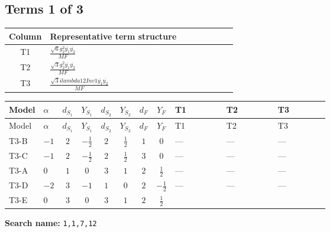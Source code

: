 \documentclass[8pt]{article}
\begin{document}
\begin{landscape}
\subsection*{Terms 1 of 3}
\begin{center}
\begin{tabular}{@{}c >{\raggedright\arraybackslash}p{0.82\linewidth}@{}}
\toprule
Column & Representative term structure \\
\midrule
T1 & \(\displaystyle \frac{\sqrt{6} g_{2}^{2} \overline{y_{1}} \overline{y_{2}}}{MF}\) \\
\midrule
T2 & \(\displaystyle \frac{\sqrt{3} g_{2}^{2} \overline{y_{1}} \overline{y_{2}}}{MF}\) \\
\midrule
T3 & \(\displaystyle \frac{\sqrt{3} i lambda12Inv1 \overline{y_{1}} \overline{y_{2}}}{MF}\) \\
\midrule
\bottomrule
\end{tabular}
\end{center}
\smallskip
\tiny
\begin{longtable}{@{}llcccccc >{\raggedright\arraybackslash}p{0.21\linewidth} >{\raggedright\arraybackslash}p{0.21\linewidth} >{\raggedright\arraybackslash}p{0.21\linewidth}@{}}
\toprule
Model & $\alpha$ & $d_{S_1}$ & $Y_{S_1}$ & $d_{S_2}$ & $Y_{S_2}$ & $d_F$ & $Y_F$ & T1 & T2 & T3 \\
\midrule
\endfirsthead
\toprule
Model & $\alpha$ & $d_{S_1}$ & $Y_{S_1}$ & $d_{S_2}$ & $Y_{S_2}$ & $d_F$ & $Y_F$ & T1 & T2 & T3 \\
\midrule
\endhead
T3-B & $-1$ & $2$ & $-\frac{1}{2}$ & $2$ & $\frac{1}{2}$ & $1$ & $0$ & --- & --- & --- \\
\midrule
T3-C & $-1$ & $2$ & $-\frac{1}{2}$ & $2$ & $\frac{1}{2}$ & $3$ & $0$ & --- & --- & --- \\
\midrule
T3-A & $0$ & $1$ & $0$ & $3$ & $1$ & $2$ & $\frac{1}{2}$ & --- & --- & --- \\
\midrule
T3-D & $-2$ & $3$ & $-1$ & $1$ & $0$ & $2$ & $-\frac{1}{2}$ & --- & --- & --- \\
\midrule
T3-E & $0$ & $3$ & $0$ & $3$ & $1$ & $2$ & $\frac{1}{2}$ & \scriptsize\adjustbox{max width=\linewidth}{$\begin{gathered} - \frac{\sqrt{6} g_{2}^{2} \overline{y_{1}} \overline{y_{2}}}{3 MF}\end{gathered}$} & \scriptsize\adjustbox{max width=\linewidth}{$\begin{gathered} - \frac{\sqrt{3} g_{2}^{2} \overline{y_{1}} \overline{y_{2}}}{6 MF}\end{gathered}$} & \scriptsize\adjustbox{max width=\linewidth}{$\begin{gathered} - \frac{\sqrt{3} i lambda12Inv1 \overline{y_{1}} \overline{y_{2}}}{6 MF}\end{gathered}$} \\
\midrule
\bottomrule
\end{longtable}
\clearpage
\noindent\textbf{Search name: }\texttt{1,1,7,12}\par\smallskip

\end{landscape}
\end{document}
